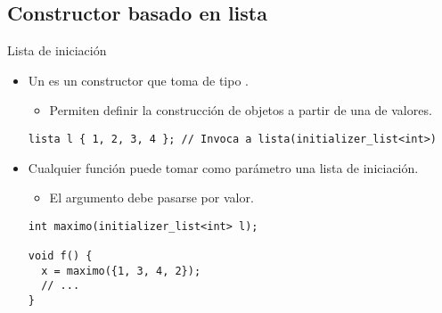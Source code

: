 \subsection{Constructor basado en lista}

\begin{frame}[fragile]{Lista de iniciación}
\begin{itemize}
  \item Un  es un constructor que toma 
         de tipo .
    \begin{itemize}
      \item Permiten definir la construcción de objetos a partir de una 
             de valores.
    \end{itemize}
\begin{lstlisting}
lista l { 1, 2, 3, 4 }; // Invoca a lista(initializer_list<int>)
\end{lstlisting}

  \item Cualquier función puede tomar como parámetro una lista de iniciación.
    \begin{itemize}
      \item El argumento debe pasarse por valor.
    \end{itemize}
\begin{lstlisting}
int maximo(initializer_list<int> l);

void f() {
  x = maximo({1, 3, 4, 2});
  // ...
}
\end{lstlisting}
\end{itemize}
\end{frame}

